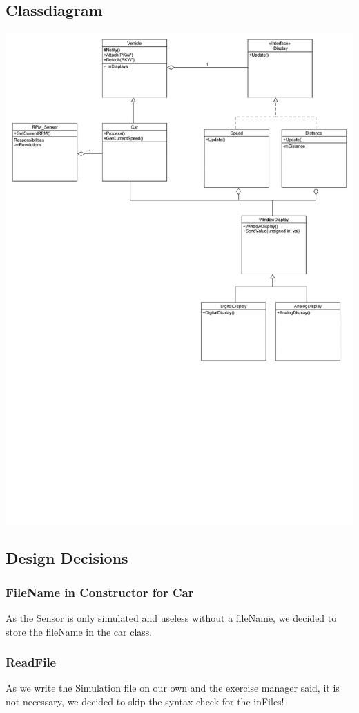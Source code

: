 \subsection{Classdiagram}
\includegraphics[scale=0.65]{ClassDiagramm}

\subsection{Design Decisions}
\subsubsection{FileName in Constructor for Car}
As the Sensor is only simulated and useless without a fileName, we decided to store the fileName in the car class.

\subsubsection{ReadFile}
As we write the Simulation file on our own and the exercise manager said, it is not necessary, we decided to skip the syntax check for the inFiles!


